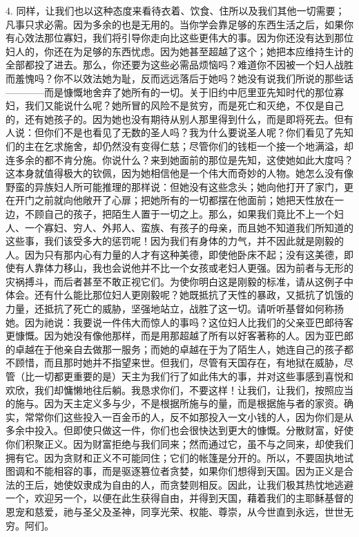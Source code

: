 4. 同样，让我们也以这种态度来看待衣着、饮食、住所以及我们其他一切需要；凡事只求必需。因为多余的也是无用的。当你学会靠足够的东西生活之后，如果你有心效法那位寡妇，我们将引导你走向比这些更伟大的事。因为你还没有达到那位妇人的，你还在为足够的东西忧虑。因为她甚至超越了这个；她把本应维持生计的全部都投了进去。那么，你还要为这些必需品烦恼吗？难道你不因被一个妇人战胜而羞愧吗？你不以效法她为耻，反而远远落后于她吗？她没有说我们所说的那些话————而是慷慨地舍弃了她所有的一切。关于旧约中厄里亚先知时代的那位寡妇，我们又能说什么呢？她所冒的风险不是贫穷，而是死亡和灭绝，不仅是自己的，还有她孩子的。因为她也没有期待从别人那里得到什么，而是即将死去。但有人说：但你们不是也看见了无数的圣人吗？我为什么要说圣人呢？你们看见了先知们的主在乞求施舍，却仍然没有变得仁慈；尽管你们的钱柜一个接一个地满溢，却连多余的都不肯分施。你说什么？来到她面前的那位是先知，这使她如此大度吗？这本身就值得极大的钦佩，因为她相信他是一个伟大而奇妙的人物。她怎么没有像野蛮的异族妇人所可能推理的那样说：但她没有这些念头；她向他打开了家门，更在开门之前就向他敞开了心扉；把她所有的一切都摆在他面前；她把天性放在一边，不顾自己的孩子，把陌生人置于一切之上。那么，如果我们竟比不上一个妇人、一个寡妇、穷人、外邦人、蛮族、有孩子的母亲，而且她不知道我们所知道的这些事，我们该受多大的惩罚呢！因为我们有身体的力气，并不因此就是刚毅的人。因为只有那内心有力量的人才有这种美德，即使他卧床不起；没有这美德，即使有人靠体力移山，我也会说他并不比一个女孩或老妇人更强。因为前者与无形的灾祸搏斗，而后者甚至不敢正视它们。为使你明白这是刚毅的标准，请从这例子中体会。还有什么能比那位妇人更刚毅呢？她既抵抗了天性的暴政，又抵抗了饥饿的力量，还抵抗了死亡的威胁，坚强地站立，战胜了这一切。请听听基督如何称扬她。因为祂说：我要说一件伟大而惊人的事吗？这位妇人比我们的父亲亚巴郎待客更慷慨。因为她没有像他那样，而是用那超越了所有以好客著称的人。因为亚巴郎的卓越在于他亲自去做那一服务；而她的卓越在于为了陌生人，她连自己的孩子都不顾惜，而且那时她并不指望来世。但我们，尽管有天国存在，有地狱在威胁，尽管（比一切都更重要的是）天主为我们行了如此伟大的事，并对这些事感到喜悦和欢欣，我们却慵懒地往后躺。我恳求你们，不要这样！让我们，让我们，按照应当的施与。因为天主定义多与少，不是根据所施与的量，而是根据施与者的家资。确实，常常你们这些投入一百金币的人，反不如那投入一文小钱的人，因为你们是从多余中投入。但即使只做这一件，你们也会很快达到更大的慷慨。分散财富，好使你们积聚正义。因为财富拒绝与我们同来；然而通过它，虽不与之同来，却使我们拥有它。因为贪财和正义不可能同住；它们的帐篷是分开的。所以，不要固执地试图调和不能相容的事，而是驱逐篡位者贪婪，如果你们想得到天国。因为正义是合法的王后，她使奴隶成为自由的人，而贪婪则相反。因此，让我们极其热忱地逃避一个，欢迎另一个，以便在此生获得自由，并得到天国，藉着我们的主耶稣基督的恩宠和慈爱，祂与圣父及圣神，同享光荣、权能、尊崇，从今世直到永远，世世无穷。阿们。\par

